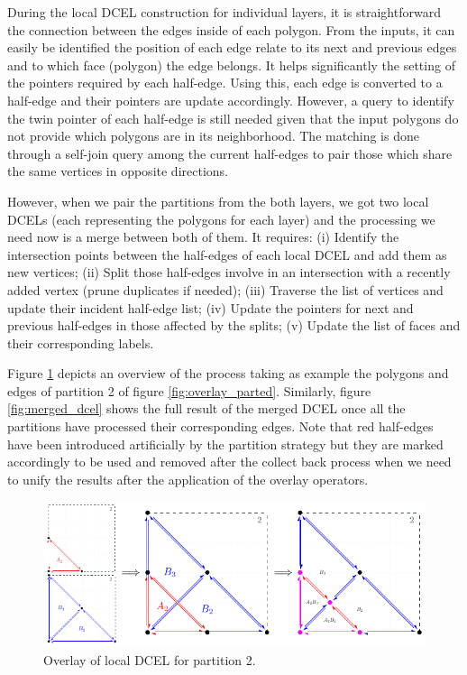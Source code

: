During the local DCEL construction for individual layers, it is straightforward the connection between the edges inside of each polygon.  From the inputs, it can easily be identified the position of each edge relate to its next and previous edges and to which face (polygon) the edge belongs.  It helps significantly the setting of the pointers required by each half-edge.   Using this, each edge is converted to a half-edge and their pointers are update accordingly.  However, a query to identify the twin pointer of each half-edge is still needed given that the input polygons do not provide which polygons are in its neighborhood. The matching is done through a self-join query among the current half-edges to pair those which share the same vertices in opposite directions.

However, when we pair the partitions from the both layers, we got two local DCELs (each representing the polygons for each layer) and the processing we need now is a merge between both of them.  It requires: (i) Identify the intersection points between the half-edges of each local DCEL and add them as new vertices; (ii) Split those half-edges involve in an intersection with a recently added vertex (prune duplicates if needed); (iii) Traverse the list of vertices and update their incident half-edge list; (iv) Update the pointers for next and previous half-edges in those affected by the splits; (v) Update the list of faces and their corresponding labels.

Figure \ref{fig:part2} depicts an overview of the process taking as example the polygons and edges of partition 2 of figure \ref{fig:overlay_parted}.  Similarly, figure \ref{fig:merged_dcel} shows the full result of the merged DCEL once all the partitions have processed their corresponding edges. Note that red half-edges have been introduced artificially by the partition strategy but they are marked accordingly to be used and removed after the collect back process when we need to unify the results after the application of the overlay operators.

\begin{figure}
    \centering
    \includegraphics[width=0.9\linewidth]{figures/02-Part2}
    \caption{Overlay of local DCEL for partition 2.}\label{fig:part2}
\end{figure}

